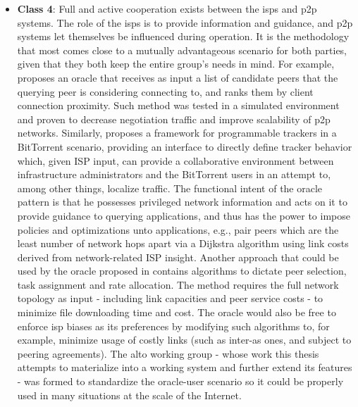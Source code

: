 \begin{itemize}
        \item \textbf{Class 4}:
            Full and active cooperation exists between the \glspl{isp} and \gls{p2p} systems.
            The role of the \glspl{isp} is to provide information and guidance, and \gls{p2p} systems let themselves be influenced during operation.
            It is the methodology that most comes close to a mutually advantageous scenario for both parties, given that they both keep the entire group's needs in mind.
            For example, \cite{locality-aware-p2p} proposes an oracle that receives as input a list of candidate peers that the querying peer is considering connecting to, and ranks them by client connection proximity.
            Such method was tested in a simulated environment and proven to decrease negotiation traffic and improve scalability of \gls{p2p} networks.
            Similarly, \cite{configurable-trackers} proposes a framework for programmable trackers in a BitTorrent scenario, providing an interface to directly define tracker behavior which, given ISP input, can provide a collaborative environment between infrastructure administrators and the BitTorrent users in an attempt to, among other things, localize traffic.
            The functional intent of the oracle pattern is that he possesses privileged network information and acts on it to provide guidance to querying applications, and thus has the power to impose policies and optimizations unto applications, e.g., pair peers which are the least number of network hops apart via a Dijkstra algorithm using link costs derived from network-related ISP insight.
            Another approach that could be used by the oracle proposed in \cite{han2009} contains algorithms to dictate peer selection, task assignment and rate allocation.
            The method requires the full network topology as input - including link capacities and peer service costs - to minimize file downloading time and cost.
            The oracle would also be free to enforce \gls{isp} biases as its preferences by modifying such algorithms to, for example, minimize usage of costly links (such as inter-\gls{as} ones, and subject to peering agreements).
            The \gls{alto} working group - whose work this thesis attempts to materialize into a working system and further extend its features - was formed to standardize the oracle-user scenario so it could be properly used in many situations at the scale of the Internet.

    \end{itemize}


